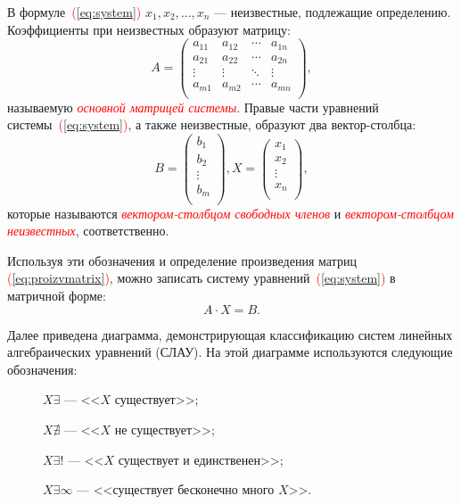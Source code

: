 \documentclass[10pt]{article}
\newcommand{\sym}{\textcolor{red}{\ding{229}}}
\numberwithin{primer}{section}
\newcommand{\term}[1]{\textcolor{red}{\emph{#1}}}
\numberwithin{equation}{section}
\newcommand{\refform}[1]{\textcolor{red}{(\ref{#1})}}
\begin{document}
В формуле~\refform{eq:system} $x_1,x_2,\dots,x_n$ --- неизвестные,
подлежащие определению. Коэффициенты при неизвестных образуют
матрицу:
\begin{equation*}\label{eq:systmatrix}
A = \begin{pmatrix}
  a_{11} & a_{12} & \cdots & a_{1n} \\
  a_{21} & a_{22} & \cdots & a_{2n} \\
  \vdots & \vdots & \ddots & \vdots \\
  a_{m1} & a_{m2} & \cdots & a_{mn} \\
\end{pmatrix},
\end{equation*}
называемую \term{основной матрицей системы}. Правые части уравнений системы~\refform{eq:system},
а также неизвестные, образуют два вектор-столбца:
\begin{equation*}\label{eq:stolbsvobchl}
B = \begin{pmatrix}
  b_1 \\
  b_2 \\
  \vdots \\
  b_m \\
\end{pmatrix},
X = \begin{pmatrix}
  x_1 \\
  x_2 \\
  \vdots \\
  x_n \\
\end{pmatrix},
\end{equation*}
которые называются \term{век\-то\-ром-столб\-цом сво\-бод\-ных чле\-нов} и \term{век\-то\-ром-столб\-цом не\-из\-вест\-ных}, соответственно.

Используя эти обозначения и определение произведения матриц \refform{eq:proizvmatrix}, можно
записать систему уравнений~\refform{eq:system} в матричной форме:
\begin{equation*}\label{eq:systmatrform}
A\cdot X = B.
\end{equation*}

Далее приведена диаграмма, демонстрирующая классификацию систем линейных алгебраических уравнений (СЛАУ).
На этой диаграмме используются следующие обозначения:
\begin{description}
    \item[\sym] $X\exists$ --- <<$X$ существует>>;
    \item[\sym] $X\nexists$ --- <<$X$ не существует>>;
    \item[\sym] $X\exists !$ --- <<$X$ существует и единственен>>;
    \item[\sym] $X\exists\infty$ --- <<существует бесконечно много $X$>>.
\end{description}
\end{document}
